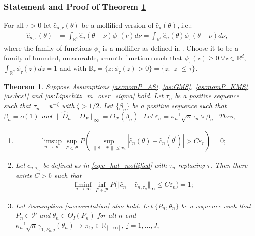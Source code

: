 \documentclass[letterpaper,11pt]{article}
\theoremstyle{myplain}
\newtheorem{theorem}{Theorem}[section]
\theoremstyle{mydefinition}
\theoremstyle{myremark}
\renewcommand{\cite}{\citet}
\newcommand{\R}{\mathbb{R}}
\numberwithin{equation}{section}
\numberwithin{figure}{section}
\begin{document}
\begin{appendices}
\subsubsection{Statement and Proof of Theorem \ref{cor:eam_conv}}
For all $\tau>0$ let $\hat{c}_{n,\tau}(\theta)$ be a mollified version of $\hat{c}_n(\theta)$, i.e.:
\begin{align}
\hat{c}_{n,\tau}(\theta)&=\int_{\R^d} \hat{c}_n(\theta-\nu)\phi_\tau(\nu)d\nu=\int_{\R^d} \hat{c}_n(\theta)\phi_\tau(\theta-\nu)d\nu,\label{eq:c_hat_mollified}
\end{align}
where the family of functions $\phi_\tau$ is a mollifier as defined in \cite[Example 7.19]{Rockafellar_Wets2005aBK}. Choose it to be a family of bounded, measurable, smooth functions such that
$\phi_\tau(z) \ge 0 ~\forall z \in \R^d$, $\int_{\R^d} \phi_\tau(z)dz=1$ and with $\mathbb{B_\tau}=\{z:\phi_\tau(z) > 0\}=\{z:\Vert z \Vert \le \tau\}$.
\begin{theorem}\label{cor:eam_conv}	
Suppose Assumptions  \ref{as:momP_AS}, \ref{as:GMS}, \ref{as:momP_KMS}, \ref{as:bcs1} and \ref{as:Lipschitz_m_over_sigma} hold. 
Let $\tau_n$ be a positive sequence such that $\tau_n=n^{-\zeta}$ with $\zeta> 1/2$.
 Let $\{\beta_n\}$ be a positive sequence such that  $\beta_n=o(1)$ and $\|\hat D_n-D_P\|_{\infty}=O_{\mathcal P}(\beta_n)$. 
Let $\varepsilon_n=\kappa_n^{-1} \sqrt n\tau_n\vee  \beta_n$.
Then, 
\begin{enumerate}
\item \label{cor:eam_conv:c_hat_Lip}
\begin{align}
\limsup_{n\to\infty}\sup_{P\in\mathcal P}P\left(\sup_{\|\theta-\theta'\|\le\tau_n}|\hat{c}_n(\theta)-\hat{c}_n(\theta^\prime)| > C\varepsilon_n\right)=0; \label{eq:c_hat_Lip}
\end{align}
\item \label{cor:eam_conv:c_mollified_Lip}
Let $\hat{c}_{n,\tau_n}$ be defined as in  \eqref{eq:c_hat_mollified} with $\tau_n$ replacing $\tau$. Then there exists $C>0$ such that
\begin{align}
\liminf_{n\to\infty}\inf_{P\in\mathcal P}P\Big(\Vert\hat{c}_n-\hat{c}_{n,\tau_n}\Vert_\infty \le C\varepsilon_n\Big)=1; \label{eq:c_mollified_Lip}
\end{align}
\item \label{cor:eam_conv:ctau_valid}
Let Assumption \ref{as:correlation} also hold. Let $\{P_n,\theta_n\}$ be a sequence such that $P_n\in\mathcal P$ and $\theta_n \in \Theta_I(P_n)$ for all $n$ and $\kappa_n^{-1}\sqrt{n}\gamma_{1,P_n,j}(\theta_n) \to \pi_{1j} \in \mathbb R_{[-\infty]},~j=1,\dots,J,$

\end{enumerate}
\end{theorem}
\end{appendices}
\end{document}
